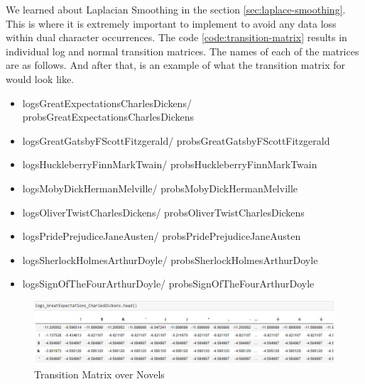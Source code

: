 We learned about Laplacian Smoothing in the section \ref{sec:laplace-smoothing}. This is where it is extremely important to implement to avoid any data loss within dual character occurrences. The code \ref{code:transition-matrix} results in individual log and normal transition matrices. The names of each of the matrices are as follows. And after that, is an example of what the transition matrix for \textcite{great_expectations} would look like.

\begin{itemize}
    \item logs\textunderscore GreatExpectations\textunderscore CharlesDickens/ probs\textunderscore GreatExpectations\textunderscore CharlesDickens
    \item logs\textunderscore GreatGatsby\textunderscore FScottFitzgerald/ probs\textunderscore GreatGatsby\textunderscore FScottFitzgerald
    \item logs\textunderscore HuckleberryFinn\textunderscore MarkTwain/ probs\textunderscore HuckleberryFinn\textunderscore MarkTwain
    \item logs\textunderscore MobyDick\textunderscore HermanMelville/ probs\textunderscore MobyDick\textunderscore HermanMelville
    \item logs\textunderscore OliverTwist\textunderscore CharlesDickens/ probs\textunderscore OliverTwist\textunderscore CharlesDickens
    \item logs\textunderscore PridePrejudice\textunderscore JaneAusten/ probs\textunderscore PridePrejudice\textunderscore JaneAusten
    \item logs\textunderscore SherlockHolmes\textunderscore ArthurDoyle/ probs\textunderscore SherlockHolmes\textunderscore ArthurDoyle
    \item logs\textunderscore SignOfTheFour\textunderscore ArthurDoyle/ probs\textunderscore SignOfTheFour\textunderscore ArthurDoyle
\end{itemize}

\begin{figure}[H]
	\begin{center}
		\includegraphics[width = 1.0\textwidth]{Images/transition_matrix.JPG} %
		\caption{Transition Matrix over Novels}
		\label{fig:dual-char-transition-matrix}
	\end{center}
\end{figure}

